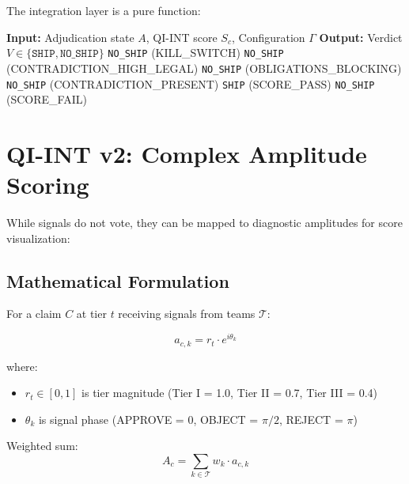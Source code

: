 \documentclass[11pt, letterpaper]{article}
\begin{document}
The integration layer is a pure function:

\begin{algorithm}
\caption{Binary Verdict Gate}
\begin{algorithmic}[1]
\STATE \textbf{Input:} Adjudication state $A$, QI-INT score $S_c$, Configuration $\Gamma$
\STATE \textbf{Output:} Verdict $V \in \{\texttt{SHIP}, \texttt{NO\_SHIP}\}$
\STATE
{}
    \RETURN \texttt{NO\_SHIP} (KILL\_SWITCH)
    \RETURN \texttt{NO\_SHIP} (CONTRADICTION\_HIGH\_LEGAL)
    \RETURN \texttt{NO\_SHIP} (OBLIGATIONS\_BLOCKING)
    \RETURN \texttt{NO\_SHIP} (CONTRADICTION\_PRESENT)
    \RETURN \texttt{SHIP} (SCORE\_PASS)
\ELSE
    \RETURN \texttt{NO\_SHIP} (SCORE\_FAIL)
\ENDIF
\end{algorithmic}
\end{algorithm}

\section{QI-INT v2: Complex Amplitude Scoring}

While signals do not vote, they can be mapped to diagnostic amplitudes for score visualization:

\subsection{Mathematical Formulation}

For a claim $C$ at tier $t$ receiving signals from teams $\mathcal{T}$:

\[
a_{c,k} = r_t \cdot e^{i\theta_k}
\]

where:
\begin{itemize}
    \item $r_t \in [0,1]$ is tier magnitude (Tier I = 1.0, Tier II = 0.7, Tier III = 0.4)
    \item $\theta_k$ is signal phase (APPROVE = 0, OBJECT = $\pi/2$, REJECT = $\pi$)
\end{itemize}

Weighted sum:
\[
A_c = \sum_{k \in \mathcal{T}} w_k \cdot a_{c,k}
\]
\end{document}
